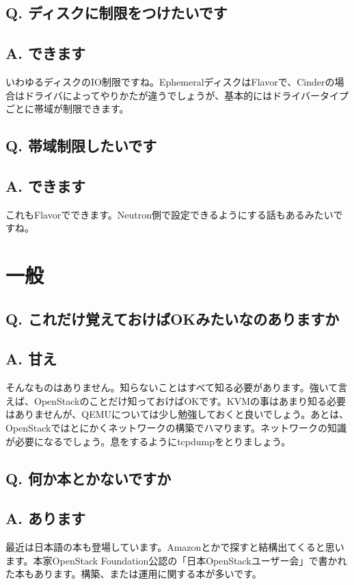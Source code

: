 \documentclass[9pt,b5paper,tombo,openany]{jsbook}
\begin{document}
\subsection*{{\bfseries Q.} ディスクに制限をつけたいです}
\subsection*{{\bfseries A.} できます}
いわゆるディスクのIO制限ですね。EphemeralディスクはFlavorで、Cinderの場合はドライバによってやりかたが違うでしょうが、基本的にはドライバータイプごとに帯域が制限できます。

\subsection*{{\bfseries Q.} 帯域制限したいです}
\subsection*{{\bfseries A.} できます}
これもFlavorでできます。Neutron側で設定できるようにする話もあるみたいですね。\\

\section{一般}

\subsection*{{\bfseries Q.} これだけ覚えておけばOKみたいなのありますか}
\subsection*{{\bfseries A.} 甘え}
そんなものはありません。知らないことはすべて知る必要があります。強いて言えば、OpenStackのことだけ知っておけばOKです。KVMの事はあまり知る必要はありませんが、QEMUについては少し勉強しておくと良いでしょう。あとは、OpenStackではとにかくネットワークの構築でハマります。ネットワークの知識が必要になるでしょう。息をするようにtcpdumpをとりましょう。

\subsection*{{\bfseries Q.} 何か本とかないですか}
\subsection*{{\bfseries A.} あります}
最近は日本語の本も登場しています。Amazonとかで探すと結構出てくると思います。本家OpenStack Foundation公認の「日本OpenStackユーザー会」で書かれた本もあります。構築、または運用に関する本が多いです。
\end{document}
